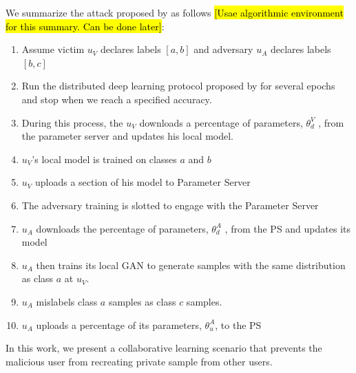 \documentclass[conference]{IEEEtran}
\begin{document}
We summarize the attack proposed by \cite{hitaj2017deep} as follows \hl{[Usae algorithmic environment for this summary. Can be done
later]}:
\begin {enumerate}
\item Assume victim $u_V$ declares labels $[a,b]$ and adversary $u_A$ declares labels $[b,c]$
\item Run the distributed deep learning protocol proposed by \cite{shokri2015privacy} for several epochs and stop when we reach a
specified accuracy.
\item During this process, the $u_V$ downloads a percentage  of parameters, $\theta^V_d$ ,  from the
parameter
server and updates his local model.
\item $u_V$'s local model is trained on classes $a$ and $b$
\item $u_V$ uploads a section of his model to Parameter Server
\item The adversary training is slotted to engage with the Parameter Server
\item $u_A$ downloads the percentage of parameters, $\theta^A_d$ , from the PS and updates its model
\item $u_A$ then trains its local GAN to generate samples with the same distribution as class $a$ at $u_V$.
\item $u_A$  mislabels class $a$ samples as class $c$ samples.
\item $u_A$ uploads a percentage of its parameters, $\theta^A_u$, to the PS
\end {enumerate}


In this work, we present a collaborative learning scenario that prevents the malicious user from recreating private sample
from other users. 



\end{document}
